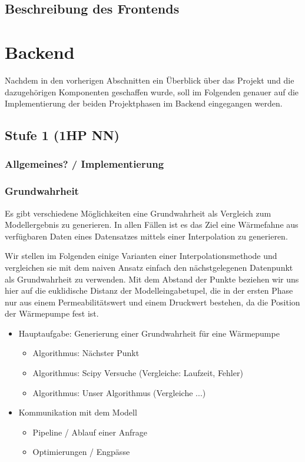 \documentclass[a4paper]{extarticle}
\begin{document}
    \subsection{Beschreibung des Frontends}



    \section{Backend}

    Nachdem in den vorherigen Abschnitten ein Überblick über das Projekt und die dazugehörigen Komponenten geschaffen wurde,
    soll im Folgenden genauer auf die Implementierung der beiden Projektphasen im Backend eingegangen werden.

    \subsection{Stufe 1 (1HP NN)}

    \subsubsection{Allgemeines? / Implementierung}

    \subsubsection{Grundwahrheit}

    Es gibt verschiedene Möglichkeiten eine Grundwahrheit als Vergleich zum Modellergebnis zu generieren.
    In allen Fällen ist es das Ziel eine Wärmefahne aus verfügbaren Daten eines Datensatzes mittels einer Interpolation zu generieren.

    Wir stellen im Folgenden einige Varianten einer Interpolationsmethode und vergleichen sie mit dem naiven Ansatz einfach den nächstgelegenen Datenpunkt als Grundwahrheit zu verwenden.
    Mit dem Abstand der Punkte beziehen wir uns hier auf die euklidische Distanz der Modelleingabetupel, 
    die in der ersten Phase nur aus einem Permeabilitätswert und einem Druckwert bestehen, da die Position der Wärmepumpe fest ist.

    
    
    \begin{itemize}
        \item Hauptaufgabe: Generierung einer Grundwahrheit für eine Wärmepumpe
        \begin{itemize}
            \item Algorithmus: Nächster Punkt
            \item Algorithmus: Scipy Versuche (Vergleiche: Laufzeit, Fehler)
            \item Algorithmus: Unser Algorithmus (Vergleiche ...)
        \end{itemize}
        \item Kommunikation mit dem Modell
        \begin{itemize}
            \item Pipeline / Ablauf einer Anfrage
            \item Optimierungen / Engpässe
        \end{itemize}
    \end{itemize}
\end{document}
